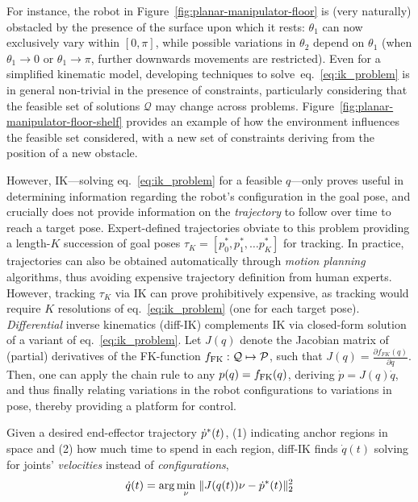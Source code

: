 For instance, the robot in Figure~\ref{fig:planar-manipulator-floor} is (very naturally) obstacled by the presence of the surface upon which it rests: \( \theta_1 \) can now exclusively vary within \([0,  \pi] \), while possible variations in \( \theta_2 \) depend on \( \theta_1 \) (when \( \theta_1 \to 0 \) or \( \theta_1 \to \pi \), further downwards movements are restricted).
Even for a simplified kinematic model, developing techniques to solve~eq.~\ref{eq:ik_problem} is in general non-trivial in the presence of constraints, particularly considering that the feasible set of solutions \( \mathcal Q \) may change across problems.
Figure~\ref{fig:planar-manipulator-floor-shelf} provides an example of how the environment influences the feasible set considered, with a new set of constraints deriving from the position of a new obstacle.

However, IK---solving eq.~\ref{eq:ik_problem} for a feasible \( q \)---only proves useful in determining information regarding the robot's configuration in the goal pose, and crucially does not provide information on the \emph{trajectory} to follow over time to reach a target pose.
Expert-defined trajectories obviate to this problem providing a length-\(K\) succession of goal poses \( \tau_K = [p^*_0, p^*_1, \dots p^*_K] \) for tracking.
In practice, trajectories can also be obtained automatically through \emph{motion planning} algorithms, thus avoiding expensive trajectory definition from human experts.
However, tracking \( \tau_K \) via IK can prove prohibitively expensive, as tracking would require \( K \) resolutions of eq.~\ref{eq:ik_problem} (one for each target pose).
\emph{Differential} inverse kinematics (diff-IK) complements IK via closed-form solution of a variant of eq.~\ref{eq:ik_problem}. 
Let \( J(q) \) denote the Jacobian matrix of (partial) derivatives of the FK-function \( f_{\text{FK}}: \mathcal Q \mapsto \mathcal P \), such that \( J(q) = \frac{\partial f_{FK}(q)}{\partial q } \).
Then, one can apply the chain rule to any \( p(q) = f_{\text{FK}}(q) \), deriving \( \dot p = J(q) \dot q \), and thus finally relating variations in the robot configurations to variations in pose, thereby providing a platform for control.

Given a desired end-effector trajectory \( \dot {p}^*(t) \), (1) indicating anchor regions in space and (2) how much time to spend in each region, diff-IK finds \( \dot q(t) \) solving for joints' \emph{velocities} instead of \emph{configurations},
\begin{align}
\dot q(t) = \arg\min_\nu \; \lVert J(q(t)) \nu - \dot {p}^* (t) \rVert_2^2
\label{eq:reg_ik_velocity}
\end{align}

